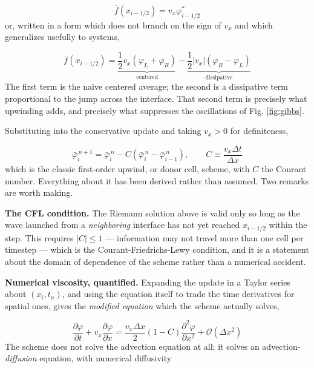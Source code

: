 \documentclass[notoc]{tufte-handout}
\begin{document}
\begin{equation}
\bar{f}(x_{i-1/2}) = v_x \varphi^*_{i-1/2}
\end{equation}
%
or, written in a form which does not branch on the sign of $v_x$ and which generalizes usefully to systems,

\begin{equation}
\bar{f}(x_{i-1/2}) = \underbrace{\frac{1}{2}v_x\left( \varphi_L + \varphi_R \right)}_{\text{centered}} - \underbrace{\frac{1}{2}\left| v_x \right|\left( \varphi_R - \varphi_L \right)}_{\text{dissipative}}
\end{equation}
%
The first term is the naive centered average; the second is a dissipative term proportional to the jump across the interface. That second term is precisely what upwinding adds, and precisely what suppresses the oscillations of Fig. \ref{fig:gibbs}.

Substituting into the conservative update and taking $v_x > 0$ for definiteness,

\begin{equation}
\boxed{ \bar{\varphi}_i^{\,n+1} = \bar{\varphi}_i^{\,n} - C \left( \bar{\varphi}_i^{\,n} - \bar{\varphi}_{i-1}^{\,n} \right) , \qquad C \equiv \frac{v_x \Delta t}{\Delta x} }
\end{equation}
%
which is the classic first-order upwind, or donor cell, scheme, with $C$ the Courant number. Everything about it has been derived rather than assumed. Two remarks are worth making.

{\bf The CFL condition.} The Riemann solution above is valid only so long as the wave launched from a {\it neighboring} interface has not yet reached $x_{i-1/2}$ within the step. This requires $\left| C \right| \le 1$ --- information may not travel more than one cell per timestep --- which is the Courant-Friedrichs-Lewy condition, and it is a statement about the domain of dependence of the scheme rather than a numerical accident.

{\bf Numerical viscosity, quantified.} Expanding the update in a Taylor series about $(x_i, t_n)$, and using the equation itself to trade the time derivatives for spatial ones, gives the {\it modified equation} which the scheme actually solves,

\begin{equation}
\frac{\partial \varphi}{\partial t} + v_x \frac{\partial \varphi}{\partial x} = \frac{v_x \Delta x}{2}\left( 1 - C \right)\frac{\partial^2 \varphi}{\partial x^2} + \mathcal{O}\!\left( \Delta x^2 \right)
\end{equation}
%
The scheme does not solve the advection equation at all; it solves an advection-{\it diffusion} equation, with numerical diffusivity
\end{document}
